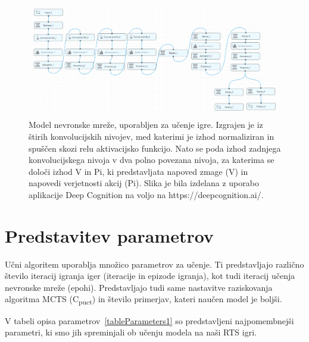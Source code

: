 \documentclass[a4paper, 12pt]{book}
\begin{document}
\begin{figure}[h]
	\begin{center}
		\includegraphics[width=1\textwidth]{photos/model_using_deepcognition.pdf}
	\end{center}
	\caption{Model nevronske mreže, uporabljen za učenje igre. Izgrajen je iz štirih konvolucijskih nivojev, med katerimi je izhod normaliziran in spuščen skozi relu aktivacijsko funkcijo. Nato se poda izhod zadnjega konvolucijskega nivoja v dva polno povezana nivoja, za katerima se določi izhod V in Pi, ki predstavljata napoved zmage (V) in napovedi verjetnosti akcij (Pi).
		Slika je bila izdelana z uporabo aplikacije Deep Cognition na voljo na https://deepcognition.ai/.}
	\label{vizualzacijaModela}
\end{figure}



\section{Predstavitev parametrov}

Učni algoritem uporablja množico parametrov za učenje.
Ti predstavljajo različno število iteracij igranja iger (iteracije in epizode igranja), kot tudi iteracij učenja nevronske mreže (epohi).
Predstavljajo tudi same nastavitve raziskovanja algoritma MCTS (C\textsubscript{puct}) in število primerjav, kateri naučen model je boljši.

V tabeli opisa parametrov~\ref{tableParameters1} so predstavljeni najpomembnejši parametri, ki smo jih spreminjali ob učenju modela na naši RTS igri.
\end{document}
